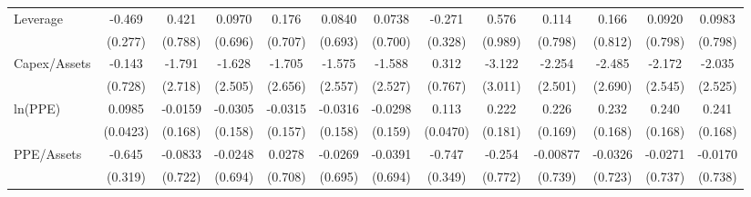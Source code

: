 {\begin{tabular}{l*{12}{c}}
Leverage            &      -0.469\sym{*}  &       0.421         &      0.0970         &       0.176         &      0.0840         &      0.0738         &      -0.271         &       0.576         &       0.114         &       0.166         &      0.0920         &      0.0983         \\
                    &     (0.277)         &     (0.788)         &     (0.696)         &     (0.707)         &     (0.693)         &     (0.700)         &     (0.328)         &     (0.989)         &     (0.798)         &     (0.812)         &     (0.798)         &     (0.798)         \\
Capex/Assets        &      -0.143         &      -1.791         &      -1.628         &      -1.705         &      -1.575         &      -1.588         &       0.312         &      -3.122         &      -2.254         &      -2.485         &      -2.172         &      -2.035         \\
                    &     (0.728)         &     (2.718)         &     (2.505)         &     (2.656)         &     (2.557)         &     (2.527)         &     (0.767)         &     (3.011)         &     (2.501)         &     (2.690)         &     (2.545)         &     (2.525)         \\
ln(PPE)             &      0.0985\sym{**} &     -0.0159         &     -0.0305         &     -0.0315         &     -0.0316         &     -0.0298         &       0.113\sym{**} &       0.222         &       0.226         &       0.232         &       0.240         &       0.241         \\
                    &    (0.0423)         &     (0.168)         &     (0.158)         &     (0.157)         &     (0.158)         &     (0.159)         &    (0.0470)         &     (0.181)         &     (0.169)         &     (0.168)         &     (0.168)         &     (0.168)         \\
PPE/Assets          &      -0.645\sym{**} &     -0.0833         &     -0.0248         &      0.0278         &     -0.0269         &     -0.0391         &      -0.747\sym{**} &      -0.254         &    -0.00877         &     -0.0326         &     -0.0271         &     -0.0170         \\
                    &     (0.319)         &     (0.722)         &     (0.694)         &     (0.708)         &     (0.695)         &     (0.694)         &     (0.349)         &     (0.772)         &     (0.739)         &     (0.723)         &     (0.737)         &     (0.738)         \\

\end{tabular}}
